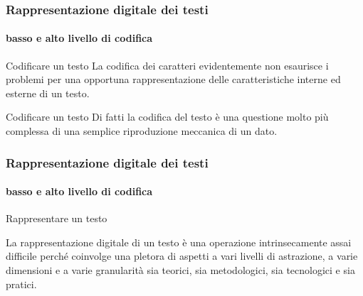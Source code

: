 







\begin{frame}
	\frametitle{Rappresentazione digitale dei testi}
	\framesubtitle{basso e alto livello di codifica}
	\addtocounter{nframe}{1}

	\begin{block}{Codificare un testo}
		La codifica dei caratteri evidentemente non esaurisce i problemi per una opportuna rappresentazione delle caratteristiche interne ed esterne di un testo.
    \end{block}
    
    \begin{block}{Codificare un testo}
		Di fatti la codifica del testo è una questione molto più complessa di una semplice riproduzione meccanica di un dato.
	\end{block}


\end{frame}


\begin{frame}
	\frametitle{Rappresentazione digitale dei testi}
	\framesubtitle{basso e alto livello di codifica}
	\addtocounter{nframe}{1}

	\begin{block}{Rappresentare un testo}
		
			La rappresentazione digitale di un testo è una operazione intrinsecamente assai difficile perché coinvolge una pletora di aspetti a vari livelli di astrazione, a varie dimensioni e a varie granularità sia teorici, sia metodologici, sia tecnologici e sia pratici.
		
	\end{block}

\end{frame}

